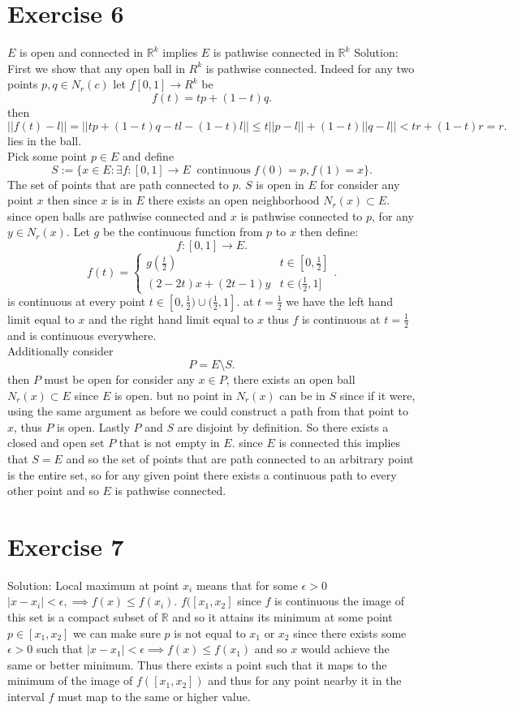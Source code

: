 \documentclass[11pt]{article}
\newcommand{\solution}[1]{{{\textcolor{header}{Solution:} \textcolor{solution}{#1}}}}
\begin{document}
\section{Exercise 6}
$E$ is open and connected in $ \mathbb{R}^{k}$ implies $E$ is pathwise connected in $ \mathbb{R}^{k}$
\solution{
    First we show that any open ball in $R^{k}$ is pathwise connected. Indeed for any two points $p,q \in N_r(c)$ let  $f[0,1] \rightarrow R^{k}$ be
    \[
    f(t) = tp + (1-t)q
    .\] 
    then
    \[
    ||f(t) - l|| = ||tp + (1-t)q - tl - (1-t)l|| \le t ||p - l|| + (1-t)||q -l|| < tr + (1-t)r = r
    .\] 
    lies in the ball.\\
    Pick some point $p \in E$ and define
    \[
        S := \{x \in E: \exists f : [0,1] \rightarrow E \;\; \text{continuous} \; f(0) = p, f(1) = x\}
    .\] 
    The set of points that are path connected to $p$. $S$ is open in $E$ for consider any point
    $x$ then since $x$ is in $E$ there exists an open neighborhood $N_r(x) \subset E$. since open balls are pathwise connected and $x$ is pathwise connected to $p$,
    for any $y \in N_r(x)$. Let $g$ be the continuous function from $p$ to $x$ then define:
     \[
         f: [0,1] \rightarrow E
    .\] 
    \[
    f(t) =
    \begin{cases}
        g(\frac{t}{2}) & t \in [0,\frac{1}{2}]\\
        (2-2t)x + (2t-1)y & t \in (\frac{1}{2},1] 
    \end{cases}
    .\] 
    is continuous at every point $t \in [0,\frac{1}{2}) \cup (\frac{1}{2}, 1]$. at $t = \frac{1}{2}$ we have the left hand limit equal to $x$ and the right hand
    limit equal to $x$ thus $f$ is continuous at $t = \frac{1}{2}$ and is continuous everywhere.\\
    Additionally consider
    \[
    P = E \setminus S
    .\] 
    then $P$ must be open for consider any $x \in P$, there exists an open ball $N_r(x) \subset E$ since $E$ is open.
    but no point in $N_r(x)$  can be in $S$ since if it were, using the same argument as before we could construct a path from that point to $x$, thus $P$ is open.
    Lastly $P$ and $S$ are disjoint by definition. So there exists a closed and open set $P$ that is not empty in $E$. since $E$ is connected this implies that $S = E$ 
    and so the set of points that are path connected to an arbitrary point is the entire set, so for any given point there exists a continuous path to every other point and so $E$ is pathwise connected.
}
\section{Exercise 7}
\solution{
    Local maximum at point $x_i$ means that for some $\epsilon > 0$ $|x-x_i| < \epsilon, \implies f(x) \le f(x_i)$.
    $f([x_1, x_2]$ since $f$ is continuous the image of this set is a compact subset of $ \mathbb{R}$ and so it attains its minimum at some point $p \in [x_1,x_2]$ we can make sure $p$ is not equal to $x_1$ or $x_2$
    since there exists some $\epsilon > 0$ such that $|x-x_1| < \epsilon \implies f(x) \le f(x_1)$ and so $x$ would achieve the same or better minimum. Thus there exists a point
    such that it maps to the minimum of the image of $f([x_1,x_2])$ and thus for any point nearby it in the interval $f$ must map to the same or higher value.
}
\end{document}
